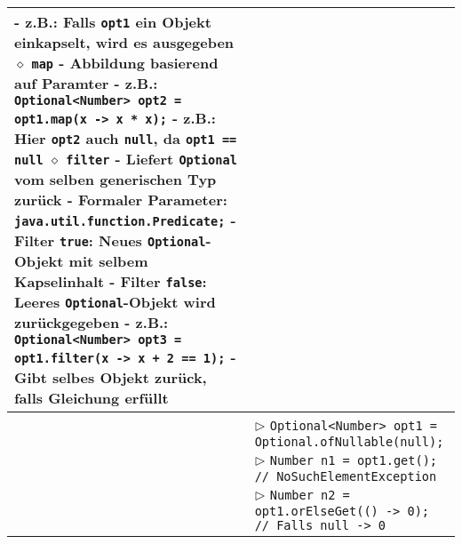 \begin{tabular}{ | p{4cm} p{13.5cm} | }
{	\hspace{0.6cm} - z.B.: Falls \texttt{opt1} ein Objekt einkapselt, wird es ausgegeben \\
	\hspace{0.4cm} $\diamond$ \texttt{map} \\
	\hspace{0.6cm} - Abbildung basierend auf Paramter \\
	\hspace{0.6cm} - z.B.: \texttt{Optional<Number> opt2 = opt1.map(x -> x * x);} \\
	\hspace{0.6cm} - z.B.: Hier \texttt{opt2} auch \texttt{null}, da \texttt{opt1 == null} \\
	\hspace{0.4cm} $\diamond$ \texttt{filter} \\
	\hspace{0.6cm} - Liefert \texttt{Optional} vom selben generischen Typ zurück \\
	\hspace{0.6cm} - Formaler Parameter: \texttt{java.util.function.Predicate;} \\
	\hspace{0.6cm} - Filter \texttt{true}: Neues \texttt{Optional}-Objekt mit selbem Kapselinhalt \\ 
	\hspace{0.6cm} - Filter \texttt{false}: Leeres \texttt{Optional}-Objekt wird zurückgegeben \\
	\hspace{0.6cm} - z.B.: \texttt{Optional<Number> opt3 = opt1.filter(x -> x + 2 == 1);} \\
	\hspace{0.6cm} - Gibt selbes Objekt zurück, falls Gleichung erfüllt } \\ \hline

	\makecell[l]{Beispiel} & \makecell[l]{$\rhd$ \texttt{Optional<Number> opt1 = Optional.ofNullable(null);} \\
	$\rhd$ \texttt{Number n1 = opt1.get(); // NoSuchElementException} \\
	$\rhd$ \texttt{Number n2 = opt1.orElseGet(() -> 0); // Falls null -> 0}  } \\ \hline
	
	\end{tabular}

